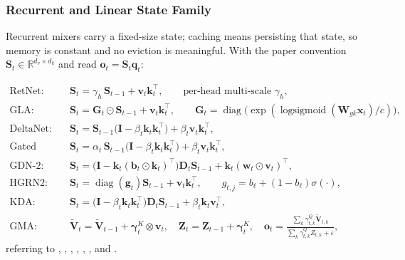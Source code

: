 \subsubsection{Recurrent and Linear State Family}

Recurrent mixers carry a fixed-size state; caching means persisting that state, so memory is constant and no eviction is meaningful. With the paper convention $\mathbf{S}_t \in \mathbb{R}^{d_v\times d_k}$ and read $\mathbf{o}_t = \mathbf{S}_t\mathbf{q}_t$:

\begin{align}
\text{RetNet:}\quad & \mathbf{S}_t = \gamma_h\,\mathbf{S}_{t-1} + \mathbf{v}_t\mathbf{k}_t^\top, \qquad \text{per-head multi-scale }\gamma_h, \\
\text{GLA:}\quad & \mathbf{S}_t = \mathbf{G}_t \odot \mathbf{S}_{t-1} + \mathbf{v}_t\mathbf{k}_t^\top, \qquad \mathbf{G}_t = \operatorname{diag}\big(\exp(\operatorname{logsigmoid}(\mathbf{W}_{gk}\mathbf{x}_t)/c)\big), \\
\text{DeltaNet:}\quad & \mathbf{S}_t = \mathbf{S}_{t-1}\big(\mathbf{I} - \beta_t\mathbf{k}_t\mathbf{k}_t^\top\big) + \beta_t\mathbf{v}_t\mathbf{k}_t^\top, \\
\text{Gated DeltaNet:}\quad & \mathbf{S}_t = \alpha_t\,\mathbf{S}_{t-1}\big(\mathbf{I} - \beta_t\mathbf{k}_t\mathbf{k}_t^\top\big) + \beta_t\mathbf{v}_t\mathbf{k}_t^\top, \\
\text{GDN-2:}\quad & \mathbf{S}_t = \big(\mathbf{I} - \mathbf{k}_t(\mathbf{b}_t\odot\mathbf{k}_t)^\top\big)\mathbf{D}_t\mathbf{S}_{t-1} + \mathbf{k}_t(\mathbf{w}_t\odot\mathbf{v}_t)^\top, \\
\text{HGRN2:}\quad & \mathbf{S}_t = \operatorname{diag}(\mathbf{g}_t)\mathbf{S}_{t-1} + \mathbf{v}_t\mathbf{k}_t^\top, \qquad g_{t,j} = b_\ell + (1-b_\ell)\sigma(\cdot), \\
\text{KDA:}\quad & \mathbf{S}_t = \big(\mathbf{I} - \beta_t\mathbf{k}_t\mathbf{k}_t^\top\big)\mathbf{D}_t\mathbf{S}_{t-1} + \beta_t\mathbf{k}_t\mathbf{v}_t^\top, \\
\text{GMA:}\quad & \tilde{\mathbf{V}}_t = \tilde{\mathbf{V}}_{t-1} + \boldsymbol{\gamma}^{K}_t \otimes \mathbf{v}_t,\quad \mathbf{Z}_t = \mathbf{Z}_{t-1} + \boldsymbol{\gamma}^{K}_t, \quad \mathbf{o}_t = \frac{\sum_k \gamma^{Q}_{t,k}\tilde{\mathbf{V}}_{t,k}}{\sum_k \gamma^{Q}_{t,k}Z_{t,k} + \varepsilon},
\end{align}
referring to \citet{sun_retentive_2023}, \citet{yang_gla_2023}, \citet{yang_deltanet_2024}, \citet{yang_gated_deltanet_2024}, \citet{hatamizadeh_gated_deltanet2_2026}, \citet{qin_hgrn2_2024}, \citet{kimi_kda_2025} and \citet{huang_gma_2026}.

